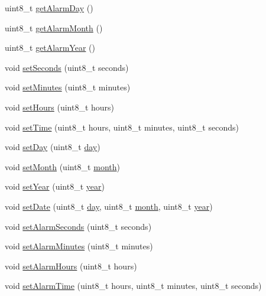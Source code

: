 \begin{DoxyCompactItemize}
\item 
uint8\+\_\+t \hyperlink{class_r_t_c_zero_a4b157a1820acba087ea42095505c35cc}{get\+Alarm\+Day} ()
\item 
uint8\+\_\+t \hyperlink{class_r_t_c_zero_a27152748cdb3ebdd15a4a51882dcd28b}{get\+Alarm\+Month} ()
\item 
uint8\+\_\+t \hyperlink{class_r_t_c_zero_af15b6757eeb9281446b7575c9a15ff19}{get\+Alarm\+Year} ()
\item 
void \hyperlink{class_r_t_c_zero_a654ea54b599e9269369c3d329dd41685}{set\+Seconds} (uint8\+\_\+t seconds)
\item 
void \hyperlink{class_r_t_c_zero_adeb4f4fbae93c46e227646569113cbd1}{set\+Minutes} (uint8\+\_\+t minutes)
\item 
void \hyperlink{class_r_t_c_zero_a4bcc1288366d943f3328386c89d39bf3}{set\+Hours} (uint8\+\_\+t hours)
\item 
void \hyperlink{class_r_t_c_zero_a2bd00b1214877c926001a8d60acad72d}{set\+Time} (uint8\+\_\+t hours, uint8\+\_\+t minutes, uint8\+\_\+t seconds)
\item 
void \hyperlink{class_r_t_c_zero_aa1d8a2279ae41b6a7b50c5ccc974b29f}{set\+Day} (uint8\+\_\+t \hyperlink{_time_8cpp_a51dcd9f072551ba8f47449a4e7f78c29}{day})
\item 
void \hyperlink{class_r_t_c_zero_af91e416057bf96c8ae94b053e94ec722}{set\+Month} (uint8\+\_\+t \hyperlink{_time_8cpp_a726c707dded9d78cf076554eceb956ec}{month})
\item 
void \hyperlink{class_r_t_c_zero_ad71c689f526dd7e40c6f134b2a223b81}{set\+Year} (uint8\+\_\+t \hyperlink{_time_8cpp_a8608865f8292c0505e02b67fd1cf39e8}{year})
\item 
void \hyperlink{class_r_t_c_zero_ad84a83a503a798c3f90f667de21b8a44}{set\+Date} (uint8\+\_\+t \hyperlink{_time_8cpp_a51dcd9f072551ba8f47449a4e7f78c29}{day}, uint8\+\_\+t \hyperlink{_time_8cpp_a726c707dded9d78cf076554eceb956ec}{month}, uint8\+\_\+t \hyperlink{_time_8cpp_a8608865f8292c0505e02b67fd1cf39e8}{year})
\item 
void \hyperlink{class_r_t_c_zero_a1b52a726c30602d3769426974f56710f}{set\+Alarm\+Seconds} (uint8\+\_\+t seconds)
\item 
void \hyperlink{class_r_t_c_zero_a06a7ea4b7bc9d61df4fef51329927b22}{set\+Alarm\+Minutes} (uint8\+\_\+t minutes)
\item 
void \hyperlink{class_r_t_c_zero_a915e7bc9c446be99d52f87cdb76e6cfe}{set\+Alarm\+Hours} (uint8\+\_\+t hours)
\item 
void \hyperlink{class_r_t_c_zero_ac16225fa8a9c07a6e8d1157b6d699747}{set\+Alarm\+Time} (uint8\+\_\+t hours, uint8\+\_\+t minutes, uint8\+\_\+t seconds)

\end{DoxyCompactItemize}
